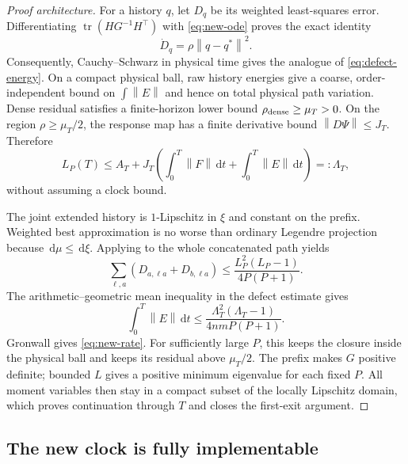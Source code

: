 \documentclass[11pt]{article}
\theoremstyle{definition}
\theoremstyle{remark}
\newcommand{\norm}[1]{\left\lVert #1\right\rVert}
\newcommand{\dd}{\,\mathrm{d}}
\begin{document}
\begin{proof}[Proof architecture]
For a history $q$, let $D_q$ be its weighted least-squares error.  Differentiating
$\operatorname{tr}(H G^{-1}H^\top)$ with \eqref{eq:new-ode} proves the exact
identity
\[
 \dot D_q=\rho\norm{q-q^*}^2.
\]
Consequently, Cauchy--Schwarz in physical time gives the analogue of
\eqref{eq:defect-energy}.  On a compact physical ball, raw history energies
give a coarse, order-independent bound on $\int\norm{E}$ and hence on total
physical path variation.  Dense residual satisfies a finite-horizon lower
bound $\rho_{\rm dense}\ge\mu_T>0$.  On the region
$\rho\ge\mu_T/2$, the response map has a finite derivative bound
$\norm{D\Psi}\le J_T$.  Therefore
\[
 L_P(T)\le A_T+J_T\left(\int_0^T\norm{F}\dd t+
 \int_0^T\norm{E}\dd t\right)=:\Lambda_T,
\]
without assuming a clock bound.

The joint extended history is $1$-Lipschitz in $\xi$ and constant on the
prefix.  Weighted best approximation is no worse than ordinary Legendre
projection because $\dd\mu\le\dd\xi$.  Applying  to the
whole concatenated path yields
\[
 \sum_{\ell,a}(D_{a,\ell a}+D_{b,\ell a})
 \le\frac{L_P^2(L_P-1)}{4P(P+1)}.
\]
The arithmetic--geometric mean inequality in the defect estimate gives
\[
 \int_0^T\norm{E}\dd t
 \le\frac{\Lambda_T^2(\Lambda_T-1)}{4nmP(P+1)}.
\]
Gronwall gives \eqref{eq:new-rate}.  For sufficiently large $P$, this keeps
the closure inside the physical ball and keeps its residual above
$\mu_T/2$.  The prefix makes $G$ positive definite; bounded $L$ gives a
positive minimum eigenvalue for each fixed $P$.  All moment variables then
stay in a compact subset of the locally Lipschitz domain, which proves
continuation through $T$ and closes the first-exit argument.
\end{proof}

\subsection{The new clock is fully implementable}
\end{document}
